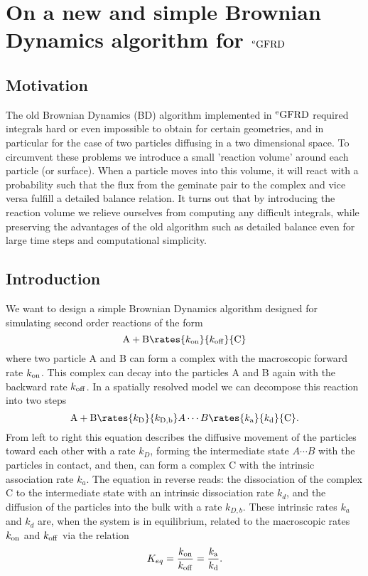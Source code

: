\section{On a new and simple Brownian Dynamics algorithm for $^{\rm{e}} \rm{GFRD}$}

\subsection{Motivation}

The old Brownian Dynamics (BD) algorithm implemented in $^{\rm{e}} \rm{GFRD}$ \cite{Morelli2008a} required integrals hard or even impossible to obtain for certain geometries, and in particular for the case of two particles diffusing in a two dimensional space. To circumvent these problems we introduce a small 'reaction volume' around each particle (or surface). When a particle moves into this volume, it will react with a probability such that the flux from the geminate pair to the complex and vice versa fulfill a detailed balance relation. It turns out that by introducing the reaction volume we relieve ourselves from computing any difficult integrals, while preserving the advantages of the old algorithm such as detailed balance even for large time steps and computational simplicity.

\subsection{Introduction}

We want to design a simple Brownian Dynamics algorithm designed for simulating second order reactions of the form
\begin{equation}
{\rm A} + {\rm B} \rates{k_{\rm on}}{k_{\rm off}} {\rm C}
\end{equation}
where two particle A and B can form a complex with the macroscopic forward rate $k_{\rm on}$. This complex can decay into the particles A and B again with the backward rate $k_{\rm off}$. In a spatially resolved model we can decompose this reaction into two steps \cite{Agmon1990}
\begin{equation}
{\rm A} + {\rm B} \rates{k_{\rm D}}{k_{\rm D,b}} A \cdots B \rates{k_{\rm a}}{k_{\rm d}} {\rm C}.
\end{equation}
From left to right this equation describes the diffusive movement of the particles toward each other with a rate $k_D$, forming the intermediate state $A \cdots B$ with the particles in contact, and then, can form a complex C with the intrinsic association rate $k_a$. The equation in reverse reads: the dissociation of the complex C to the intermediate state with an intrinsic dissociation rate $k_d$, and the diffusion of the particles into the bulk with a rate $k_{D,b}$. These intrinsic rates $k_a$ and $k_d$ are, when the system is in equilibrium, related to the macroscopic rates $k_{\rm on}$ and $k_{\rm off}$ via the relation \cite{Agmon1990}
\begin{equation}
K_{eq} = \frac{k_{\rm on}}{k_{\rm off}} = \frac{k_{\rm a}}{k_{\rm d}}.
\end{equation}

